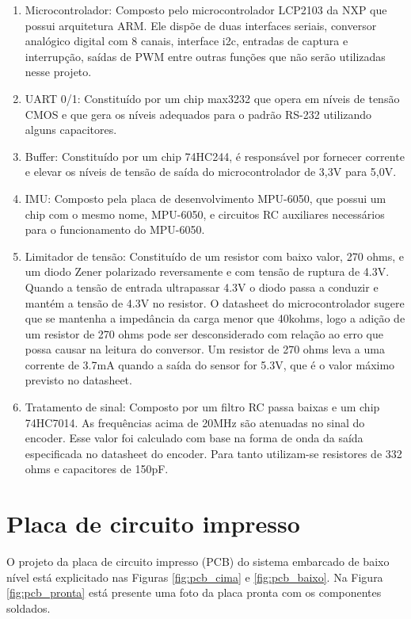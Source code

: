\begin{enumerate}[topsep=0pt, partopsep=0pt, itemsep=0pt]
    \item Microcontrolador: Composto pelo microcontrolador LCP2103 da NXP que possui arquitetura ARM. Ele dispõe de duas interfaces seriais, conversor analógico digital com 8 canais, interface i2c, entradas de captura e interrupção, saídas de PWM entre outras funções que não serão utilizadas nesse projeto.
    \item UART 0/1: Constituído por um chip max3232 que opera em níveis de tensão CMOS e que gera os níveis adequados para o padrão RS-232 utilizando alguns capacitores.
    \item Buffer: Constituído por um chip 74HC244, é responsável por fornecer corrente e elevar os níveis de tensão de saída do microcontrolador de 3,3V para 5,0V.
    \item IMU: Composto pela placa de desenvolvimento MPU-6050, que possui um chip com o mesmo nome, MPU-6050, e circuitos RC auxiliares necessários para o funcionamento do MPU-6050.
    \item Limitador de tensão: Constituído de um resistor com baixo valor, 270 ohms, e um diodo Zener polarizado reversamente e com tensão de ruptura de 4.3V. Quando a tensão de entrada ultrapassar 4.3V o diodo passa a conduzir e mantém a tensão de 4.3V no resistor. O datasheet do microcontrolador sugere que se mantenha a impedância da carga menor que 40kohms, logo a adição de um resistor de 270 ohms pode ser desconsiderado com relação ao erro que possa causar na leitura do conversor. Um resistor de 270 ohms leva a uma corrente de 3.7mA quando a saída do sensor for 5.3V, que é o valor máximo previsto no datasheet.
    \item Tratamento de sinal: Composto por um filtro RC passa baixas e um chip 74HC7014. As frequências acima de 20MHz são atenuadas no sinal do encoder. Esse valor foi calculado com base na forma de onda da saída especificada no datasheet do encoder. Para tanto utilizam-se resistores de 332 ohms e capacitores de 150pF.
\end{enumerate}


\section{Placa de circuito impresso}

O projeto da placa de circuito impresso (PCB) do sistema embarcado de baixo nível está explicitado nas Figuras \ref{fig:pcb_cima} e \ref{fig:pcb_baixo}. Na Figura \ref{fig:pcb_pronta} está presente uma foto da placa pronta com os componentes soldados.

